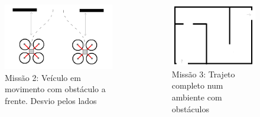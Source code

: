 \documentclass{beamer}
\begin{document}
\begin{frame}
\begin{columns}[T]
			\begin{column}[T]{3cm} %
				\begin{figure}
					\centering
					\includegraphics[keepaspectratio = true,
					width=1.1\textwidth]{img/missao2.png}
					\caption{Missão 2: Veículo em movimento com obstáculo a frente. Desvio pelos lados}
					\label{fig:missao2}
				\end{figure}
			\end{column}
			\begin{column}[T]{3cm} %
				\begin{figure}
					\centering
					\includegraphics[keepaspectratio = true,
					width=1.0\textwidth]{img/missao3.png}
					\caption{Missão 3: Trajeto completo num ambiente com obstáculos}
					\label{fig:missao3}
				\end{figure}
			\end{column}
		\end{columns}
			
			
\end{frame}	
\end{document}
